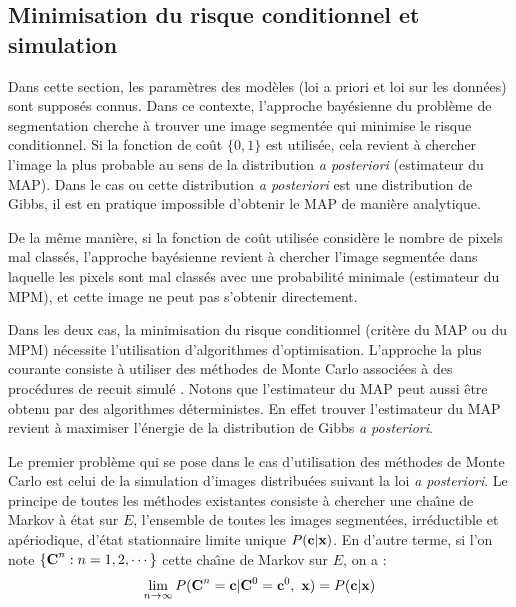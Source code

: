 \subsection{Minimisation du risque conditionnel et simulation}



Dans cette section, les param\`etres des mod\`eles (loi a priori et loi
sur les donn\'ees) sont suppos\'es connus.
Dans ce contexte, l'approche bay\'esienne du probl\`eme de segmentation cherche
\`a trouver une image segment\'ee qui  minimise le risque conditionnel.
Si  la fonction de co\^ut $\{0 , 1 \}$ est  utilis\'ee,
cela revient \`a chercher l'image la plus probable au sens
de la distribution {\em a posteriori} (estimateur du MAP). Dans le cas
ou cette distribution {\em a posteriori} est une distribution
de Gibbs, il est en pratique impossible d'obtenir le 
MAP de mani\`ere analytique. 

De la m\^eme mani\`ere, si la fonction de co\^ut utilis\'ee 
consid\`ere le nombre de pixels mal class\'es, l'approche
bay\'esienne revient \`a chercher l'image segment\'ee
dans laquelle les pixels sont mal class\'es avec une
probabilit\'e minimale (estimateur du MPM), et cette
image ne peut pas s'obtenir directement. 


Dans les deux cas, la minimisation du risque conditionnel 
(crit\`ere du MAP  ou du MPM) n\'ecessite l'utilisation d'algorithmes
d'optimisation. L'approche la plus courante consiste \`a utiliser 
des m\'ethodes de Monte Carlo associ\'ees \`a des proc\'edures de
recuit simul\'e \cite{Geman1984}. Notons que l'estimateur du MAP
peut aussi \^etre obtenu par des algorithmes d\'eterministes. En effet
trouver l'estimateur du MAP revient \`a maximiser l'\'energie de la 
distribution de Gibbs {\em a posteriori}.

Le premier probl\`eme qui se pose dans le cas d'utilisation des
m\'ethodes de Monte Carlo est celui de la simulation d'images
distribu\'ees suivant la loi {\em a posteriori}. Le principe de
toutes les m\'ethodes existantes consiste \`a chercher
une cha\^\i ne de Markov \`a \'etat sur $E$, l'ensemble de
toutes les images segment\'ees, irr\'eductible et ap\'eriodique,
d'\'etat stationnaire limite unique $P(\mbox{\bf c} | \mbox{\bf x})$. 
En d'autre terme, si l'on note $\{ \mbox{\bf C}^n : n=1,2,\cdots \}$ cette cha\^\i ne de 
Markov  sur $E$, on a :
$$
\lim_{n\rightarrow \infty} P(\mbox{\bf C}^n = \mbox{\bf c} | \mbox{\bf C}^0 = \mbox{\bf c}^0, \ \mbox{\bf x} )= P(\mbox{\bf c} | \mbox{\bf x})
$$



